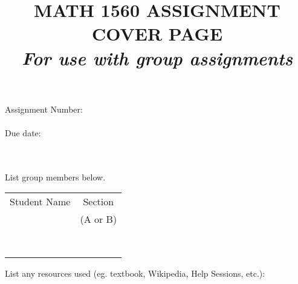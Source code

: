 \documentclass[12pt,letterpaper]{article}
\title{MATH 1560 ASSIGNMENT COVER PAGE\\
\textit{For use with group assignments}}
\date{}
\begin{document}
\maketitle
\large
\begin{tabbing}
Assignment Number: \= \underline{\hspace{1in}}\\
\\
Due date: \> \underline{\hspace{4in}}\\
\\
\\
\end{tabbing}

\noindent List group members below. \\

\bigskip

\begin{tabular}{cc}
 Student Name & Section\\
 & (A or B) \\
&\\
\underline{\hspace{4in}} & \underline{\hspace{1in}} \\
&\\
\underline{\hspace{4in}} & \underline{\hspace{1in}} \\
&\\
\underline{\hspace{4in}} & \underline{\hspace{1in}} \\
&\\
\underline{\hspace{4in}} & \underline{\hspace{1in}} 
\end{tabular}


\bigskip


\bigskip

\noindent List any resources used (eg. textbook, Wikipedia, Help Sessions, etc.):
\end{document}
